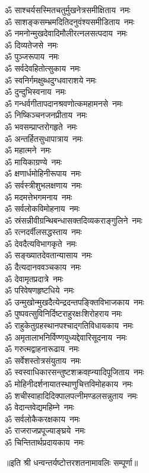 \begin{multicols}{2}
\begin{flushleft}
ॐ साश्चर्यसस्मितचतुर्मुखनेत्र\-समीक्षिताय~नमः\\
ॐ साशङ्कसम्भ्रमदितिदनुवंश्य\-समीडिताय~नमः\\
ॐ नमनोन्मुखदेवादिमौलीरत्न\-लसत्पदाय~नमः\\
ॐ दिव्यतेजसे~नमः\\
ॐ पुञ्जरूपाय~नमः\\
ॐ सर्वदेवहितोत्सुकाय~नमः\\
ॐ स्वनिर्गमक्षुब्धदुग्धवाराशये नमः\hfill{}\\
ॐ दुन्दुभिस्वनाय~नमः\\
ॐ गन्धर्वगीतापदानश्रवणोत्क\-महामनसे~नमः\\
ॐ निष्किञ्चनजनप्रीताय~नमः\\
ॐ भवसम्प्राप्तरोगहृते~नमः\\
ॐ अन्तर्हितसुधापात्राय~नमः\\
ॐ महात्मने~नमः\\
ॐ मायिकाग्रण्ये~नमः\\
ॐ क्षणार्धमोहिनीरूपाय~नमः\\
ॐ सर्वस्त्रीशुभलक्षणाय~नमः\\
ॐ मदमत्तेभगमनाय~नमः\hfill{}\\
ॐ सर्वलोकविमोहनाय~नमः\\
ॐ स्रंसन्नीवीग्रन्थिबन्धासक्त\-दिव्यकराङ्गुलिने~नमः\\
ॐ रत्नदर्वीलसद्धस्ताय~नमः\\
ॐ देवदैत्यविभागकृते~नमः\\
ॐ सङ्ख्यातदेवतान्यासाय~नमः\\
ॐ दैत्यदानववञ्चकाय~नमः\\
ॐ देवामृतप्रदात्रे~नमः\\
ॐ परिवेषणहृष्टधिये~नमः\\
ॐ उन्मुखोन्मुखदैत्येन्द्रदन्त\-पङ्क्तिविभाजकाय~नमः\\
ॐ पुष्पवत्सुविनिर्दिष्टराहुरक्षः\-शिरोहराय नमः\hfill{}\\
ॐ राहुकेतुग्रहस्थानपश्चाद्गति\-विधायकाय~नमः\\
ॐ अमृतालाभनिर्विण्ण\-युध्यद्देवारि\-सूदनाय~नमः\\
ॐ गरुत्मद्वाहनारूढाय~नमः\\
ॐ सर्वेशस्तोत्रसंयुताय~नमः\\
ॐ स्वस्वाधिकारसन्तुष्ट\-शक्रवह्न्यादिपूजिताय~नमः\\
ॐ मोहिनीदर्शनायात\-स्थाणुचित्तविमोहकाय~नमः\\
ॐ शचीस्वाहादिदिक्पालपत्नी\-मण्डलसन्नुताय~नमः\\
ॐ वेदान्तवेद्यमहिम्ने~नमः\\
ॐ सर्वलोकैकरक्षकाय~नमः\\
ॐ राजराजप्रपूज्याङ्घ्रये~नमः\hfill{}\\
ॐ चिन्तितार्थप्रदायकाय~नमः\\
\end{flushleft}
\end{multicols}
॥इति श्री धन्वन्तर्यष्टोत्तरशतनामावलिः सम्पूर्णा॥
